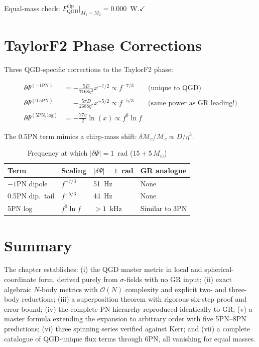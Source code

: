 \documentclass[11pt,a4paper]{article}
\theoremstyle{plain}
\theoremstyle{definition}
\theoremstyle{remark}
\newcommand{\Ms}{M_\odot}
\newcommand{\Fp}{F_{\mathrm{QGD}}^{\mathrm{dip}}}
\begin{document}
Equal-mass check: $\Fp|_{M_1=M_2} = 0.000$~W.\quad$\checkmark$

\section{TaylorF2 Phase Corrections}
\label{sec:phase_corrections}

Three QGD-specific corrections to the TaylorF2 phase:

\begin{align}
  \delta\Psi^{(-1\mathrm{PN})} &= -\frac{5D}{7168\eta^2}x^{-7/2} \propto f^{-7/3} \qquad\text{(unique to QGD)} \\
  \delta\Psi^{(0.5\mathrm{PN})} &= -\frac{5\pi D}{2688\eta^2}x^{-5/2} \propto f^{-5/3} \qquad\text{(same power as GR leading!)} \\
  \delta\Psi^{(5\mathrm{PN,log})} &= -\frac{27\eta}{2}\ln(x) \propto f^0\ln f
\end{align}

The 0.5PN term mimics a chirp-mass shift: $\delta\mathcal{M}_c/\mathcal{M}_c \propto D/\eta^3$.

\begin{table}[h]
  \centering
  \caption{Frequency at which $|\delta\Psi| = 1$~rad ($15+5\,\Ms$)}
  \begin{tabular}{@{}llll@{}}
    \toprule
    Term & Scaling & $|\delta\Psi| = 1$~rad & GR analogue \\
    \midrule
    $-1$PN dipole & $f^{-7/3}$ & 51~Hz & None \\
    0.5PN dip.\ tail & $f^{-5/3}$ & 44~Hz & None \\
    5PN log & $f^0\ln f$ & $>1$~kHz & Similar to 3PN \\
    \bottomrule
  \end{tabular}
\end{table}

\section{Summary}

The chapter establishes: (i) the QGD master metric in local and spherical-coordinate form, derived purely from $\sigma$-fields with no GR input; (ii) exact algebraic $N$-body metrics with $\mathcal{O}(N)$ complexity and explicit two- and three-body reductions; (iii) a superposition theorem with rigorous six-step proof and error bound; (iv) the complete PN hierarchy reproduced identically to GR; (v) a master formula extending the expansion to arbitrary order with five 5PN--8PN predictions; (vi) three spinning series verified against Kerr; and (vii) a complete catalogue of QGD-unique flux terms through 6PN, all vanishing for equal masses.
\end{document}

